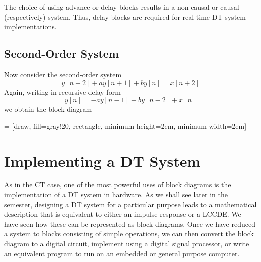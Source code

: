 The choice of using advance or delay blocks results in a non-causal or causal (respectively) system. Thus, delay blocks are required for real-time DT system implementations.

\subsection*{Second-Order System}

Now consider the second-order system
\[
y[n+2] + ay[n+1] + by[n] = x[n+2]
\]
Again, writing in recursive delay form 
\[
y[n] = -ay[n-1] - by[n-2] + x[n]
\]
we obtain the block diagram
\begin{center}
   = [draw, fill=gray!20, rectangle, 
      minimum height=2em, minimum width=2em]
\end{center}

\section{Implementing a DT System}

As in the CT case, one of the most powerful uses of block diagrams is the implementation of a DT system in hardware. As we shall see later in the semester, designing a DT system for a particular purpose leads to a mathematical description that is equivalent to either an impulse response or a LCCDE. We have seen how these can be represented as block diagrams. Once we have reduced a system to blocks consisting of simple operations, we can then convert the block diagram to a digital circuit, implement using a digital signal processor, or write an equivalent program to run on an embedded or general purpose computer.

